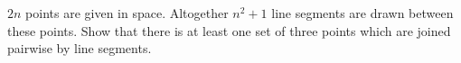 $2n$ points are given in space. Altogether $n^2 + 1$ line segments are drawn between these points. Show that there is at least one set of three points which are joined pairwise by line segments.
